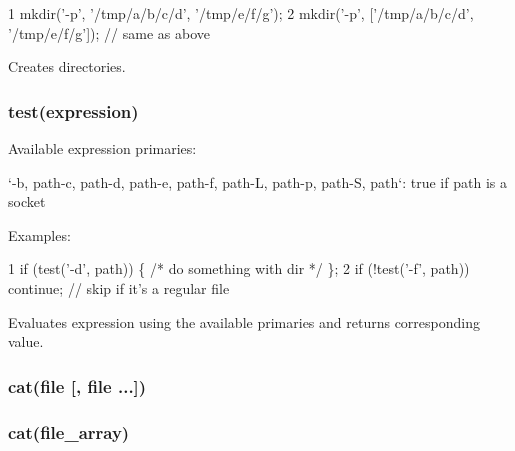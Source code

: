 \begin{DoxyCode}
1 mkdir('-p', '/tmp/a/b/c/d', '/tmp/e/f/g');
2 mkdir('-p', ['/tmp/a/b/c/d', '/tmp/e/f/g']); // same as above
\end{DoxyCode}


Creates directories.

\subsubsection*{test(expression)}

Available expression primaries\+:


\begin{DoxyItemize}
\item `\textquotesingle{}-\/b\textquotesingle{}, \textquotesingle{}path\textquotesingle{}-\/c\textquotesingle{}, \textquotesingle{}path\textquotesingle{}-\/d\textquotesingle{}, \textquotesingle{}path\textquotesingle{}-\/e\textquotesingle{}, \textquotesingle{}path\textquotesingle{}-\/f\textquotesingle{}, \textquotesingle{}path\textquotesingle{}-\/\+L\textquotesingle{}, \textquotesingle{}path\textquotesingle{}-\/p\textquotesingle{}, \textquotesingle{}path\textquotesingle{}-\/\+S\textquotesingle{}, \textquotesingle{}path\textquotesingle{}`\+: true if path is a socket
\end{DoxyItemize}

Examples\+:


\begin{DoxyCode}
1 if (test('-d', path)) \{ /* do something with dir */ \};
2 if (!test('-f', path)) continue; // skip if it's a regular file
\end{DoxyCode}


Evaluates expression using the available primaries and returns corresponding value.

\subsubsection*{cat(file \mbox{[}, file ...\mbox{]})}

\subsubsection*{cat(file\+\_\+array)}

